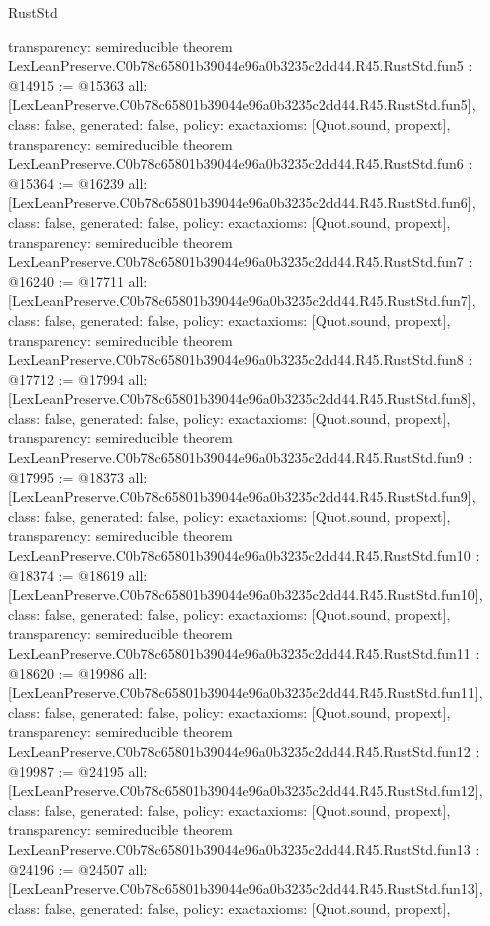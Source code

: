 \begin{lexlean}{RustStd}
\begin{coremodule}
{  transparency: semireducible
}
theorem LexLeanPreserve.C0b78c65801b39044e96a0b3235c2dd44.R45.RustStd.fun5 : @14915 := @15363 {
  all: [LexLeanPreserve.C0b78c65801b39044e96a0b3235c2dd44.R45.RustStd.fun5],
  class: false,
  generated: false,
  policy: exact{axioms: [Quot.sound, propext]},
  transparency: semireducible
}
theorem LexLeanPreserve.C0b78c65801b39044e96a0b3235c2dd44.R45.RustStd.fun6 : @15364 := @16239 {
  all: [LexLeanPreserve.C0b78c65801b39044e96a0b3235c2dd44.R45.RustStd.fun6],
  class: false,
  generated: false,
  policy: exact{axioms: [Quot.sound, propext]},
  transparency: semireducible
}
theorem LexLeanPreserve.C0b78c65801b39044e96a0b3235c2dd44.R45.RustStd.fun7 : @16240 := @17711 {
  all: [LexLeanPreserve.C0b78c65801b39044e96a0b3235c2dd44.R45.RustStd.fun7],
  class: false,
  generated: false,
  policy: exact{axioms: [Quot.sound, propext]},
  transparency: semireducible
}
theorem LexLeanPreserve.C0b78c65801b39044e96a0b3235c2dd44.R45.RustStd.fun8 : @17712 := @17994 {
  all: [LexLeanPreserve.C0b78c65801b39044e96a0b3235c2dd44.R45.RustStd.fun8],
  class: false,
  generated: false,
  policy: exact{axioms: [Quot.sound, propext]},
  transparency: semireducible
}
theorem LexLeanPreserve.C0b78c65801b39044e96a0b3235c2dd44.R45.RustStd.fun9 : @17995 := @18373 {
  all: [LexLeanPreserve.C0b78c65801b39044e96a0b3235c2dd44.R45.RustStd.fun9],
  class: false,
  generated: false,
  policy: exact{axioms: [Quot.sound, propext]},
  transparency: semireducible
}
theorem LexLeanPreserve.C0b78c65801b39044e96a0b3235c2dd44.R45.RustStd.fun10 : @18374 := @18619 {
  all: [LexLeanPreserve.C0b78c65801b39044e96a0b3235c2dd44.R45.RustStd.fun10],
  class: false,
  generated: false,
  policy: exact{axioms: [Quot.sound, propext]},
  transparency: semireducible
}
theorem LexLeanPreserve.C0b78c65801b39044e96a0b3235c2dd44.R45.RustStd.fun11 : @18620 := @19986 {
  all: [LexLeanPreserve.C0b78c65801b39044e96a0b3235c2dd44.R45.RustStd.fun11],
  class: false,
  generated: false,
  policy: exact{axioms: [Quot.sound, propext]},
  transparency: semireducible
}
theorem LexLeanPreserve.C0b78c65801b39044e96a0b3235c2dd44.R45.RustStd.fun12 : @19987 := @24195 {
  all: [LexLeanPreserve.C0b78c65801b39044e96a0b3235c2dd44.R45.RustStd.fun12],
  class: false,
  generated: false,
  policy: exact{axioms: [Quot.sound, propext]},
  transparency: semireducible
}
theorem LexLeanPreserve.C0b78c65801b39044e96a0b3235c2dd44.R45.RustStd.fun13 : @24196 := @24507 {
  all: [LexLeanPreserve.C0b78c65801b39044e96a0b3235c2dd44.R45.RustStd.fun13],
  class: false,
  generated: false,
  policy: exact{axioms: [Quot.sound, propext]},
}
\end{coremodule}
\end{lexlean}
